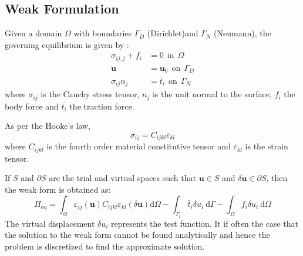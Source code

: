\documentclass[12pt, a4paper]{report}
\begin{document}
\subsection{Weak Formulation}
Given a domain $\Omega$ with boundaries $\Gamma_D$ (Dirichlet)and $\Gamma_N$ (Neumann), the governing equilibrium is given by  \cite{iga_element}\cite{strong_eq}:
\begin{align}
\sigma_{i j, j}+f_{i} &=0 ~~\text{in}~~ \Omega\\
\mathbf{u}&=\mathbf{u}_{0} ~~\text{on}~~ \Gamma_{D}\\
\sigma_{i j} n_{j}&=\bar{t}_{i} ~~\text{on}~~ \Gamma_{N}
\end{align}
where $\sigma_{i j}$ is the Cauchy stress tensor, $n_j$ is the unit normal to the surface, $f_i$ the body force and $\bar{t_i}$ the traction force.
\par
As per the Hooke's law,
\begin{equation}
    \sigma_{i j}= C_{ijkl}\varepsilon_{kl}
\end{equation}
where $C_{ijkl}$ is the fourth order material constitutive tensor and $\varepsilon_{kl}$ is the strain tensor.
\par
If $S$ and $\partial S$ are the trial and virtual spaces such that $\mathbf{u} \in S$ and $\delta \mathbf{u} \in \partial S$, then the weak form is obtained as:
\begin{equation} \label{eq: weak}
   \Pi_{\mathrm{eq}}=\int_{\Omega} \varepsilon_{i j}(\mathbf{u}) C_{i j k l} \varepsilon_{k l}(\delta \mathbf{u}) \mathrm{d} \Omega-\int_{\Gamma_{t}} \bar{t}_{i} \delta u_{i} \mathrm{~d} \Gamma-\int_{\Omega} f_{i} \delta u_{i} \mathrm{~d} \Omega 
\end{equation}
The virtual displacement $\delta u_{i}$ represents the test function. It if often the case that the solution to the weak form cannot be found analytically and hence the problem is discretized to find the approximate solution.
\end{document}
